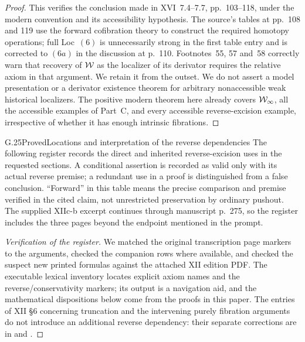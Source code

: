 \begin{proof}
This verifies the conclusion made in XVI~7.4--7.7, pp.~103--118, under the modern convention and its accessibility hypothesis. The source's tables at pp.~108 and 119 use the forward cofibration theory to construct the required homotopy operations; full Loc~$(6)$ is unnecessarily strong in the first table entry and is corrected to $(6a)$ in the discussion at p.~110. Footnotes~55, 57 and~58 correctly warn that recovery of $\mathcal{W}$ as the localizer of its derivator requires the relative axiom in that argument. We retain it from the outset. We do not assert a model presentation or a derivator existence theorem for arbitrary nonaccessible weak historical localizers. The positive modern theorem here already covers $\mathcal{W}_{\infty}$, all the accessible examples of Part~C, and every accessible reverse-excision example, irrespective of whether it has enough intrinsic fibrations.
\end{proof}

\begin{claim}{G.25}{Proved}{Locations and interpretation of the reverse dependencies}
The following register records the direct and inherited reverse-excision uses in the requested sections. A conditional assertion is recorded as valid only with its actual reverse premise; a redundant use in a proof is distinguished from a false conclusion. ``Forward'' in this table means the precise comparison and premise verified in the cited claim, not unrestricted preservation by ordinary pushout. The supplied XIIc-b excerpt continues through manuscript p.~275, so the register includes the three pages beyond the endpoint mentioned in the prompt.
\end{claim}
\begin{proof}[Verification of the register]
We matched the original transcription page markers to the arguments, checked the companion rows where available, and checked the suspect new printed formulas against the attached XII edition PDF. The executable lexical inventory  locates explicit axiom names and the reverse/\allowbreak conservativity markers; its output is a navigation aid, and the mathematical dispositions below come from the proofs in this paper. The entries of XII \S6 concerning truncation and the intervening purely fibration arguments do not introduce an additional reverse dependency: their separate corrections are in  and .
\end{proof}

